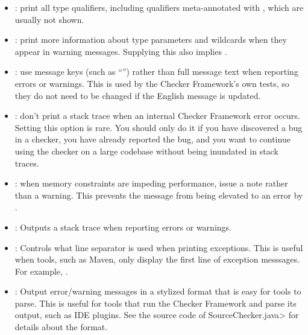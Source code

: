 \begin{itemize}
\item {}: print all type qualifiers, including
qualifiers meta-annotated with , which are
usually not shown.

\item {}: print more information about type
  parameters and wildcards when they appear in warning messages.  Supplying
  this also implies .

\item {}: use message keys (such as ``'')
rather than full message text when reporting errors or warnings.  This is
used by the Checker Framework's own tests, so they do not need to be
changed if the English message is updated.

\item {}: don't print a stack trace when an
internal Checker Framework error occurs.  Setting this option is rare.  You
should only do it if you have discovered a bug in a checker, you have
already reported the bug, and you want to continue using the checker on a
large codebase without being inundated in stack traces.

\item {}: when memory constraints are
impeding performance, issue a note rather than a warning.
This prevents the message from being elevated to an error by .

\item {}: Outputs a stack trace when reporting errors or warnings.

\item {}: Controls what line separator is used when printing exceptions.
This is useful when tools, such as Maven, only display the first line of exception messsages. For
example, .

\end{itemize}



\begin{itemize}

\item {}: Output error/warning messages in a
  stylized format that is easy for tools to parse.  This is useful for
  tools that run the Checker Framework and parse its output, such as IDE
  plugins.  See the source code of \<SourceChecker.java> for details about
  the format.

\end{itemize}

